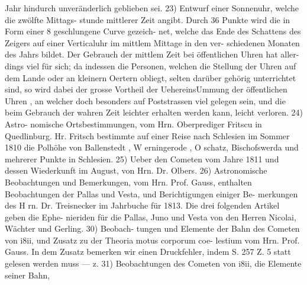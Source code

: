 \documentclass[12pt,a4paper]{article}
\begin{document}
Jahr hindurch unveränderlich geblieben sei. 23) Entwurf einer Sonnenuhr, welche die zwölfte Mittags-\newline
stunde mittlerer Zeit angibt. Durch 36 Punkte wird die in Form einer 8 geschlungene Curve gezeich-\newline
net, welche das Ende des Schattens des Zeigers auf einer Verticaluhr im mittlem Mittage in den ver-\newline
schiedenen Monaten des Jahrs bildet. Der Gebrauch der mittlem Zeit bei öffentlichen Uhren hat aller-\newline
dings viel für sich; da indessen die Personen, welchen die Stellung der Uhren auf dem Lande oder an\newline
kleinern Oertern obliegt, selten darüber gehörig unterrichtet sind, so wird dabei der grosse Vortheil\newline
der UehereinsUmmung der öffentlichen Uhren , an welcher doch besonders auf Poststrassen viel gelegen\newline
sein, und die beim Gebrauch der wahren Zeit leichter erhalten werden kann, leicht verloren. 24) Astro-\newline
nomische Ortsbestimmungen, vom Hrn. Oberprediger Fritscu in Quedlinburg. Hr. Fritsch bestimmte\newline
auf einer Reise nach Schlesien im Sommer 1810 die Polhöhe von Ballenstedt , W erningerode , O schatz,\newline
Bischofswerda und mehrerer Punkte in Schlesien. 25) Ueber den Cometen vom Jahre 1811 und dessen\newline
Wiederkunft im August, von Hrn. Dr. Olbers. 26) Astronomische Beobachtungen und Bemerkungen,\newline
vom Hrn. Prof. Gauss, enthalten Beobachtungen der Pallas und Vesta, und Berichtigungen einiger Be-\newline
merkungen des H rn. Dr. Treisnecker im Jahrbuche für 1813. Die drei folgenden Artikel geben die Ephe-\newline
nieriden für die Pallas, Juno und Vesta von den Herren Nicolai, Wächter und Gerling. 30) Beobach-\newline
tungen und Elemente der Bahn des Cometen von i8ii, und Zusatz zu der Theoria motus corporum coe-\newline
lestium vom Hrn. Prof. Gauss. In dem Zusatz bemerken wir einen Druckfehler, indem S. 257 Z. 5 statt gelesen werden muss --- z. 31) Beobachtungen des Cometen von i8ii, die Elemente seiner Bahn,\newline
\end{document}
